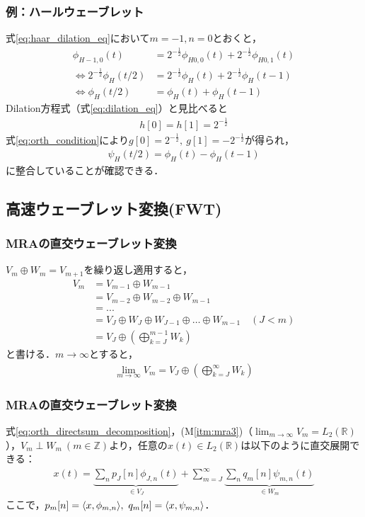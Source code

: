 \documentclass[dvipdfmx,graphicx,14pt]{beamer}
\begin{document}
\begin{frame}[c]
    \frametitle{例：ハールウェーブレット}
    式\eqref{eq:haar_dilation_eq}において$m=-1, n=0$とおくと，
    \begin{align*}
        \phi_{H -1,0}(t) &= 2^{-\frac{1}{2}} \phi_{H 0,0}(t) + 2^{-\frac{1}{2}} \phi_{H 0,1}(t) \\
        \iff 2^{-\frac{1}{2}} \phi_{H}(t/2) &= 2^{-\frac{1}{2}} \phi_{H}(t) + 2^{-\frac{1}{2}} \phi_{H}(t - 1) \\
        \iff \phi_{H}(t/2) &= \phi_{H}(t) + \phi_{H}(t - 1)
    \end{align*}
    Dilation方程式（式\eqref{eq:dilation_eq}）と見比べると
    \begin{align*}
        h[0] = h[1] = 2^{-\frac{1}{2}}
    \end{align*}
    式\eqref{eq:orth_condition}により$g[0] = 2^{-\frac{1}{2}},\ g[1] = -2^{-\frac{1}{2}}$が得られ，
    \begin{align*}
        \psi_{H}(t/2) = \phi_{H}(t) - \phi_{H}(t - 1)
    \end{align*}
    に整合していることが確認できる．
\end{frame}

\subsection{高速ウェーブレット変換(FWT)}

\begin{frame}[c]
    \frametitle{MRAの直交ウェーブレット変換}
    $V_{m} \oplus W_{m} = V_{m+1}$を繰り返し適用すると，
    \begin{align*}
        V_{m} &= V_{m-1} \oplus W_{m-1} \\
        &= V_{m-2} \oplus W_{m-2} \oplus W_{m-1} \\
        &= ... \\
        &= V_{J} \oplus W_{J} \oplus W_{J-1} \oplus \dots \oplus W_{m-1} \quad (J < m) \\
        &= V_{J} \oplus \left( \bigoplus_{k=J}^{m-1} W_{k} \right)
    \end{align*}
    と書ける．$m\to\infty$とすると，
    \begin{align}
        \lim_{m \to \infty} V_{m} = V_{J} \oplus \left( \bigoplus_{k=J}^{\infty} W_{k} \right) \label{eq:orth_directsum_decomposition}
    \end{align}
\end{frame}

\begin{frame}[c]
    \frametitle{MRAの直交ウェーブレット変換}
    式\eqref{eq:orth_directsum_decomposition}，(M\ref{itm:mra3})（$\lim_{m\to\infty} V_{m} = L_{2}(\mathbb{R})$），$V_{m} \perp W_{m}\ (m \in \mathbb{Z})$より，任意の$x(t) \in L_{2}(\mathbb{R})$は以下のように直交展開できる：
    \begin{align}
        x(t) = \underbrace{\sum_{n} p_{J}[n] \phi_{J,n}(t)}_{\in V_{J}} + \sum_{m=J}^{\infty} \underbrace{\sum_{n} q_{m}[n] \psi_{m,n}(t)}_{\in W_{m}} \label{eq:orth_decomp}
    \end{align}
    ここで，$p_{m}[n] = \langle x, \phi_{m,n} \rangle,\ q_{m}[n] = \langle x, \psi_{m,n} \rangle$．
\end{frame}
\end{document}
